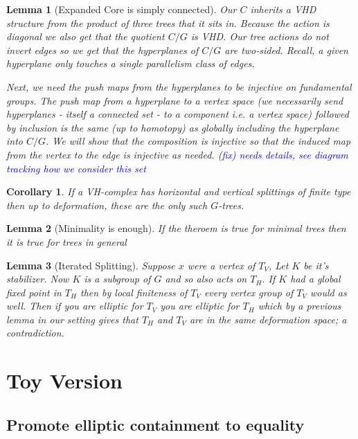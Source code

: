 \documentclass{article}
\newcommand{\fix}[1]{\textcolor{blue}{(fix) #1}}
\theoremstyle{mystyle}
\newtheorem{lem}{Lemma}[section]
\newtheorem*{cor*}{Corollary}
\theoremstyle{remark}
\begin{document}
\begin{lem}
    [Expanded Core is simply connected]
    \label{lem:coresc} 
    Our \(C\) inherits a VHD structure from the product of three trees that it sits in. Because the action is diagonal we also get that the quotient \(C/G\) is VHD. Our tree actions do not invert edges so we get that the hyperplanes of \(C/G\) are two-sided. Recall, a given hyperplane only touches a single parallelism class of edges. 

    Next, we need the push maps from the hyperplanes to be injective on fundamental groups. The push map from a hyperplane to a vertex space (we necessarily send hyperplanes - itself a connected set - to a component i.e. a vertex space) followed by inclusion is the same (up to homotopy) as globally including the hyperplane into \(C/G\). We will show that the composition is injective so that the induced map from the vertex to the edge is injective as needed. \fix{needs details, see diagram tracking how we consider this set}
\end{lem}

\begin{cor*}
    If a VH-complex has horizontal and vertical splittings of finite type then up to deformation, these are the only such \(G\)-trees.
\end{cor*}

\begin{lem}
    [Minimality is enough]
    \label{lem:minenough} 
    If the theroem is true for minimal trees then it is true for trees in general
\end{lem}

\begin{lem}
    [Iterated Splitting]
    \label{lem:iteratedsplitting} 
    Suppose \(x\) were a vertex of \(T_{V}\), Let \(K\) be it's stabilizer. Now \(K\) is a subgroup of \(G\) and so also acts on \(T_H\). If \(K\) had a global fixed point in \(T_H\)  then by local finiteness of \(T_V\) every vertex group of \(T_V\) would as well. Then if you are elliptic for \(T_V\) you are elliptic for \(T_H\) which by a previous lemma in our setting gives that \(T_H\) and \(T_V\) are in the same deformation space; a contradiction.
\end{lem}
\section{Toy Version}
\subsection{Promote elliptic containment to equality}
\end{document}
